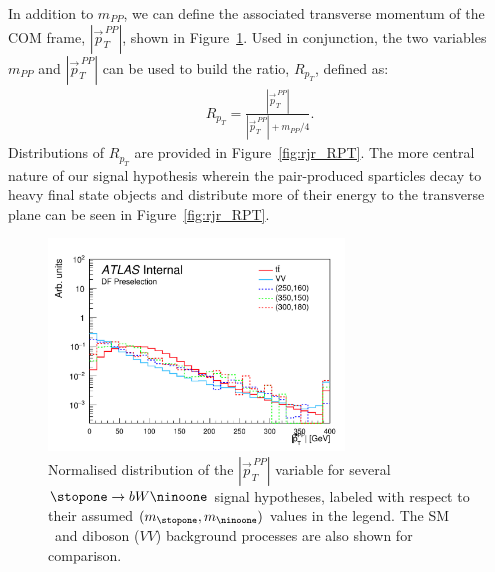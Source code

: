 In addition to $m_{PP}$, we can define the associated transverse momentum of the COM frame,
$|\vec{p}_T^{\,PP}|$, shown in Figure~\ref{fig:rjr_pTT_T}.
Used in conjunction, the two variables $m_{PP}$ and $|\vec{p}_T^{\,PP}|$ can be used to build the
ratio, $R_{p_T}$, defined as:
\begin{align}
    R_{p_T}  = \frac{
        |\vec{p}_T^{\,PP}|
    }
    {
        |\vec{p}_T^{\,PP}| + m_{PP}/4
    }.
    \label{eq:rjr_rpt}
\end{align}
Distributions of $R_{p_T}$ are provided in Figure~\ref{fig:rjr_RPT}.
The more central nature of our signal hypothesis wherein the pair-produced sparticles decay to
heavy final state objects and distribute more of their energy to the transverse plane can be seen
in Figure~\ref{fig:rjr_RPT}.

\begin{figure}[!htb]
    \begin{center}
        \includegraphics[width=0.7\textwidth]{figures/search_stop2l/strategy/comp_plots/dfpresel_pTT_T}
        \caption{
            Normalised distribution of the $|\vec{p}_T^{\,PP}|$ variable for several $\stopone \rightarrow b W \ninoone$
            signal hypotheses, labeled with respect to their assumed $(m_{\stopone}, m_{\ninoone})$ values in the
            legend.
            The SM \ttbar~and diboson ($VV$) background processes are also shown for comparison.
        }
        \label{fig:rjr_pTT_T}
    \end{center}
\end{figure}

